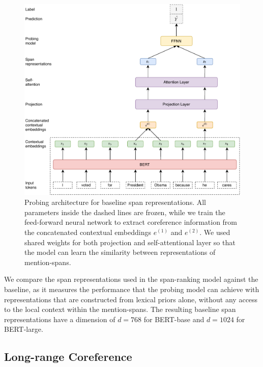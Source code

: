 \documentclass[11pt]{article}
\begin{document}
\begin{figure}[ht]
  \includegraphics[width=\textwidth]{baseline_span}
  \caption{Probing architecture for baseline span representations. All parameters inside the dashed lines are frozen, while we train the feed-forward neural network to extract coreference information from the concatenated contextual embeddings $e^{(1)}$ and $e^{(2)}$. We used shared weights for both projection and self-attentional layer so that the model can learn the similarity between representations of mention-spans.}
  \label{fig:baseline} 
\end{figure}

We compare the span representations used in the span-ranking model against the baseline, as it measures the performance that the probing model can achieve with representations that are constructed from lexical priors alone, without any access to the local context within the mention-spans. The resulting baseline span representations have a dimension of $d = 768$ for BERT-base and $d = 1024$ for BERT-large.

\subsection{Long-range Coreference}
\end{document}
